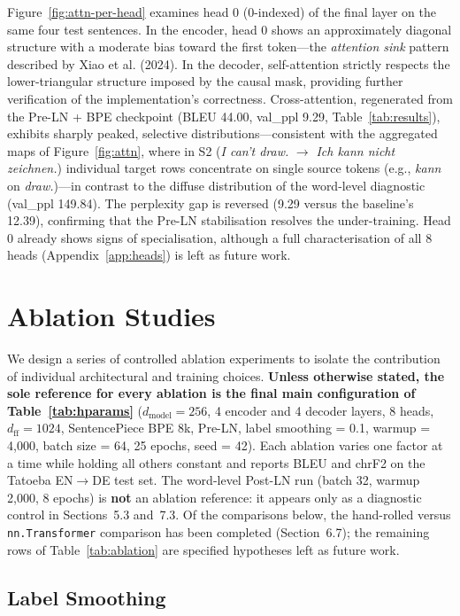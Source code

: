 \documentclass[10pt]{article}
\begin{document}
Figure~\ref{fig:attn-per-head} examines head 0 (0-indexed) of the final layer on the same four test sentences. In the encoder, head 0 shows an approximately diagonal structure with a moderate bias toward the first token---the \textit{attention sink} pattern described by Xiao et al. (2024). In the decoder, self-attention strictly respects the lower-triangular structure imposed by the causal mask, providing further verification of the implementation's correctness. Cross-attention, regenerated from the Pre-LN + BPE checkpoint (BLEU 44.00, val\_ppl 9.29, Table~\ref{tab:results}), exhibits sharply peaked, selective distributions---consistent with the aggregated maps of Figure~\ref{fig:attn}, where in S2 (\textit{I can't draw.} $\rightarrow$ \textit{Ich kann nicht zeichnen.}) individual target rows concentrate on single source tokens (e.g., \textit{kann} on \textit{draw.})---in contrast to the diffuse distribution of the word-level diagnostic (val\_ppl 149.84). The perplexity gap is reversed (9.29 versus the baseline's 12.39), confirming that the Pre-LN stabilisation resolves the under-training. Head 0 already shows signs of specialisation, although a full characterisation of all 8 heads (Appendix~\ref{app:heads}) is left as future work.

\section{Ablation Studies}

We design a series of controlled ablation experiments to isolate the contribution of individual architectural and training choices. \textbf{Unless otherwise stated, the sole reference for every ablation is the final main configuration of Table~\ref{tab:hparams}} ($d_{\text{model}}=256$, 4 encoder and 4 decoder layers, 8 heads, $d_{\text{ff}}=1024$, SentencePiece BPE 8k, Pre-LN, label smoothing = 0.1, warmup = 4{,}000, batch size = 64, 25 epochs, seed = 42). Each ablation varies one factor at a time while holding all others constant and reports BLEU and chrF2 on the Tatoeba EN$\rightarrow$DE test set. The word-level Post-LN run (batch 32, warmup 2{,}000, 8 epochs) is \textbf{not} an ablation reference: it appears only as a diagnostic control in Sections~5.3 and~7.3. Of the comparisons below, the hand-rolled versus \texttt{nn.Transformer} comparison has been completed (Section~6.7); the remaining rows of Table~\ref{tab:ablation} are specified hypotheses left as future work.

\subsection{Label Smoothing}
\end{document}
